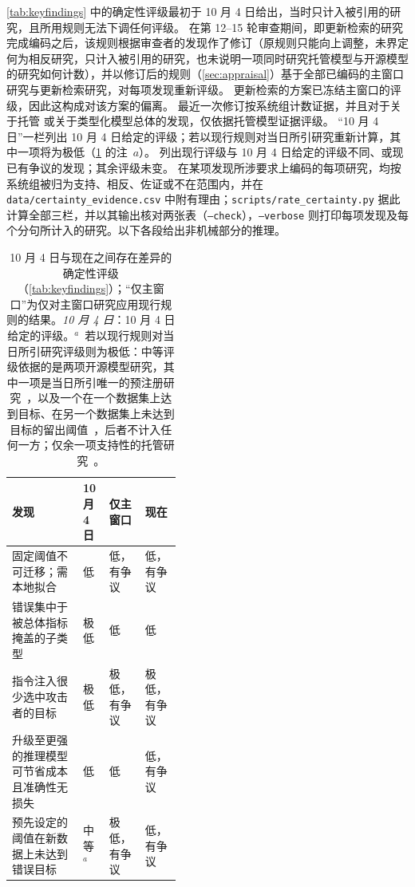 \cref{tab:keyfindings} 中的确定性评级最初于 10 月 4 日给出，当时只计入被引用的研究，且所用规则无法下调任何评级。
在第 12--15 轮审查期间，即更新检索的研究完成编码之后，该规则根据审查者的发现作了修订（原规则只能向上调整，未界定何为相反研究，只计入被引用的研究，也未说明一项同时研究托管模型与开源模型的研究如何计数），并以修订后的规则（\cref{sec:appraisal}）基于全部已编码的主窗口研究与更新检索研究，对每项发现重新评级。
更新检索的方案已冻结主窗口的评级，因此这构成对该方案的偏离。
最近一次修订按系统组计数证据，并且对于关于托管 \jev{} 或关于类型化模型总体的发现，仅依据托管模型证据评级。
“10 月 4 日”一栏列出 10 月 4 日给定的评级；若以现行规则对当日所引研究重新计算，其中一项将为极低（\cref{tab:certchanges} 的注~$a$）。
 列出现行评级与 10 月 4 日给定的评级不同、或现已有争议的发现；其余评级未变。
在某项发现所涉要求上编码的每项研究，均按系统组被归为支持、相反、佐证或不在范围内，并在 \nolinkurl{data/certainty_evidence.csv} 中附有理由；\nolinkurl{scripts/rate_certainty.py} 据此计算全部三栏，并以其输出核对两张表（\texttt{--check}），\texttt{--verbose} 则打印每项发现及每个分句所计入的研究。以下各段给出非机械部分的推理。

\begin{table}[!htbp]
\centering
\small
\caption{10 月 4 日与现在之间存在差异的确定性评级（\cref{tab:keyfindings}）；“仅主窗口”为仅对主窗口研究应用现行规则的结果。\emph{10 月 4 日}：10 月 4 日给定的评级。$^{a}$~若以现行规则对当日所引研究评级则为极低：中等评级依据的是两项开源模型研究，其中一项是当日所引唯一的预注册研究~\cite{arx33843,zen23041163}，以及一个在一个数据集上达到目标、在另一个数据集上未达到目标的留出阈值~\cite{arx00346}，后者不计入任何一方；仅余一项支持性的托管研究~\cite{arx33401}。}
\label{tab:certchanges}
\begin{tabular}{@{}p{0.42\linewidth}lll@{}}
\toprule
发现 & 10 月 4 日 & 仅主窗口 & 现在 \\
\midrule
固定阈值不可迁移；需本地拟合 & 低 & 低，有争议 & 低，有争议 \\
错误集中于被总体指标掩盖的子类型 & 极低 & 低 & 低 \\
指令注入很少选中攻击者的目标 & 极低 & 极低，有争议 & 极低，有争议 \\
升级至更强的推理模型可节省成本且准确性无损失 & 低 & 低 & 低，有争议 \\
预先设定的阈值在新数据上未达到错误目标 & 中等$^{a}$ & 极低，有争议 & 低，有争议 \\
\bottomrule
\end{tabular}
\end{table}

